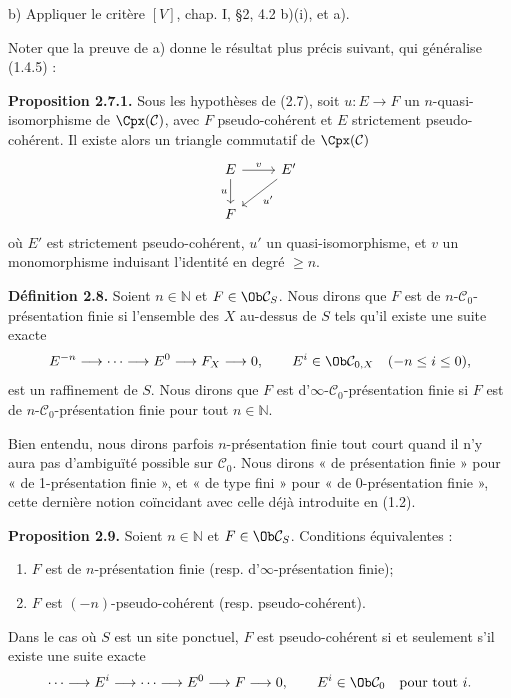 \documentclass[11pt]{article}
\begin{document}
b) Appliquer le critère \([V]\), chap. I, §2, 4.2 b)(i), et a).

Noter que la preuve de a) donne le résultat plus précis suivant, qui généralise (1.4.5) :

\textbf{Proposition 2.7.1.} Sous les hypothèses de (2.7), soit \(u:E\to F\) un \(n\)-quasi-isomorphisme de \(\Cpx(\mathcal C)\), avec \(F\) pseudo-cohérent et \(E\) strictement pseudo-cohérent. Il existe alors un triangle commutatif de \(\Cpx(\mathcal C)\)
\[
\begin{tikzcd}
E \arrow[r,"v"] \arrow[d,"u"'] & E' \arrow[dl,"u'"]\\
F &
\end{tikzcd}
\]
où \(E'\) est strictement pseudo-cohérent, \(u'\) un quasi-isomorphisme, et \(v\) un monomorphisme induisant l'identité en degré \(\geq n\).

\textbf{Définition 2.8.} Soient \(n\in\mathbb N\) et \(F\in\Ob\mathcal C_S\). Nous dirons que \(F\) est de \(n\)-\(\mathcal C_0\)-présentation finie si l'ensemble des \(X\) au-dessus de \(S\) tels qu'il existe une suite exacte
\[
  E^{-n}\longrightarrow\cdots\longrightarrow E^0\longrightarrow F_X\longrightarrow 0,
\qquad E^i\in\Ob\mathcal C_{0,X}\quad(-n\leq i\leq 0),
\]
est un raffinement de \(S\). Nous dirons que \(F\) est d'\(\infty\)-\(\mathcal C_0\)-présentation finie si \(F\) est de \(n\)-\(\mathcal C_0\)-présentation finie pour tout \(n\in\mathbb N\).

Bien entendu, nous dirons parfois \(n\)-présentation finie tout court quand il n'y aura pas d'ambiguïté possible sur \(\mathcal C_0\). Nous dirons « de présentation finie » pour « de 1-présentation finie », et « de type fini » pour « de 0-présentation finie », cette dernière notion coïncidant avec celle déjà introduite en (1.2).

\textbf{Proposition 2.9.} Soient \(n\in\mathbb N\) et \(F\in\Ob\mathcal C_S\). Conditions équivalentes :
\begin{enumerate}[label=(\roman*)]
\item \(F\) est de \(n\)-présentation finie (resp. d'\(\infty\)-présentation finie);
\item \(F\) est \((-n)\)-pseudo-cohérent (resp. pseudo-cohérent).
\end{enumerate}
Dans le cas où \(S\) est un site ponctuel, \(F\) est pseudo-cohérent si et seulement s'il existe une suite exacte
\[
  \cdots\longrightarrow E^i\longrightarrow\cdots\longrightarrow E^0\longrightarrow F\longrightarrow 0,
\qquad E^i\in\Ob\mathcal C_0\quad\text{pour tout }i.
\]
\end{document}
